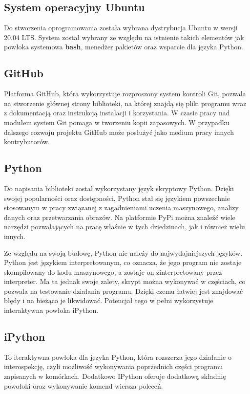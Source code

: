 \subsection{System operacyjny Ubuntu}
\quad Do stworzenia oprogramowania została wybrana dystrybucja Ubuntu w wersji 20.04 LTS. System został wybrany ze względu na istnienie takich elementów jak powłoka systemowa \textbf{bash}, menedżer pakietów oraz wsparcie dla języka Python. 

\subsection{GitHub}
\quad Platforma GitHub, która wykorzystuje rozproszony system kontroli Git, pozwala na stworzenie głównej strony biblioteki, na której znajdą się pliki programu wraz z dokumentacją oraz instrukcją instalacji i korzystania. W czasie pracy nad modułem system Git pomaga w tworzeniu kopii zapasowych. W przypadku dalszego rozwoju projektu GitHub może posłużyć jako medium pracy innych kontrybutorów. 

\subsection{Python}
\quad Do napisania biblioteki został wykorzystany język skryptowy Python. Dzięki swojej popularności oraz dostępności, Python stał się językiem powszechnie stosowanym w pracy związanej z zagadnieniami uczenia maszynowego, analizy danych oraz przetwarzania obrazów. Na platformie PyPi można znaleźć wiele narzędzi pozwalających na pracę właśnie w tych dziedzinach, jak i również wielu innych. 

\quad Ze względu na swoją budowę, Python nie należy do najwydajniejszych języków. Python jest językiem interpretowanym, co oznacza, że jego program nie zostaje skompilowany do kodu maszynowego, a zostaje on zinterpretowany przez interpreter. Ma ta jednak swoje zalety, skrypt można wykonywać w częściach, co pozwala na testowanie działania programu. Dzięki czemu łatwiej jest znajdować błędy i na bieżąco je likwidować. Potencjał tego w pełni wykorzystuje interaktywna powłoka iPython. 

\subsection{iPython}
\quad To iteraktywna powłoka dla języka Python, która rozszerza jego działanie o interospekcję, czyli możliwość wykonywania poprzednich części programu zapisanych w komórkach. Dodatkowo IPython oferuje dodatkową składnię powołoki oraz wykonywanie komend wiersza poleceń. 

